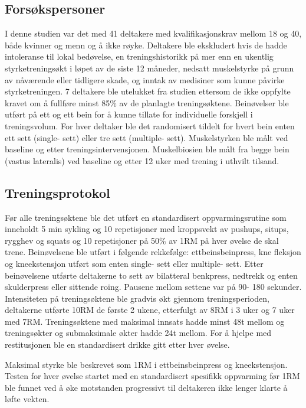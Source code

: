 \documentclass[
]{book}
\begin{document}
\hypertarget{forsuxf8kspersoner}{%
\subsection{Forsøkspersoner}\label{forsuxf8kspersoner}}

I denne studien var det med 41 deltakere med kvalifikasjonskrav mellom 18 og 40, både kvinner og menn og å ikke røyke. Deltakere ble ekskludert hvis de hadde intoleranse til lokal bedøvelse, en treningshistorikk på mer enn en ukentlig styrketreningsøkt i løpet av de siste 12 måneder, nedsatt muskelstyrke på grunn av nåværende eller tidligere skade, og inntak av medisiner som kunne påvirke styrketreningen. 7 deltakere ble utelukket fra studien ettersom de ikke oppfylte kravet om å fullføre minst 85\% av de planlagte treningsøktene. Beinøvelser ble utført på ett og ett bein for å kunne tillate for individuelle forskjell i treningsvolum. For hver deltaker ble det randomisert tildelt for hvert bein enten ett sett (single- sett) eller tre sett (multiple- sett). Muskelstyrken ble målt ved baseline og etter treningsintervensjonen. Muskelbiosien ble målt fra begge bein (vastus lateralis) ved baseline og etter 12 uker med trening i uthvilt tilsand.

\hypertarget{treningsprotokol}{%
\subsection{Treningsprotokol}\label{treningsprotokol}}

Før alle treningsøktene ble det utført en standardisert oppvarmingsrutine som inneholdt 5 min sykling og 10 repetisjoner med kroppsvekt av pushups, situps, rygghev og squats og 10 repetisjoner på 50\% av 1RM på hver øvelse de skal trene. Beinøvelsene ble utført i følgende rekkefølge: ettbeinsbeinpress, kne fleksjon og kneekstensjon utført som enten single- sett eller multiple- sett. Etter beinøvelsene utførte deltakerne to sett av bilatteral benkpress, nedtrekk og enten skulderpress eller sittende roing. Pausene mellom settene var på 90- 180 sekunder. Intensiteten på treningsøktene ble gradvis økt gjennom treningsperioden, deltakerne utførte 10RM de første 2 ukene, etterfulgt av 8RM i 3 uker og 7 uker med 7RM. Treningsøktene med maksimal innsats hadde minst 48t mellom og treningsøkter og submaksimale økter hadde 24t mellom. For å hjelpe med restitusjonen ble en standardisert drikke gitt etter hver øvelse.

Maksimal styrke ble beskrevet som 1RM i ettbeinsbeinpress og kneekstensjon. Testen for hver øvelse startet med en standardisert spesifikk oppvarming før 1RM ble funnet ved å øke motstanden progressivt til deltakeren ikke lenger klarte å løfte vekten.
\end{document}
